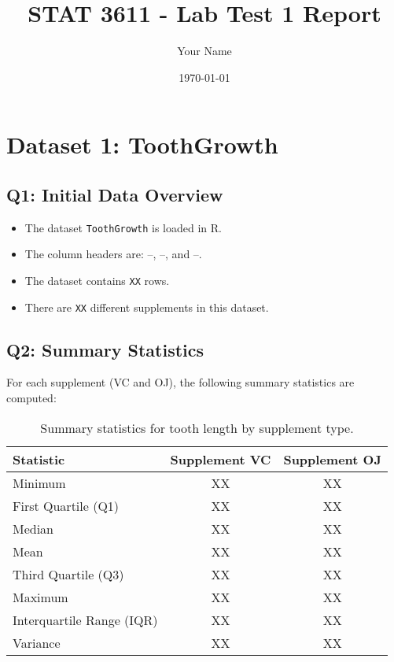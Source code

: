 \documentclass{article}
\title{STAT 3611 - Lab Test 1 Report}
\author{Your Name}
\date{\today}
\begin{document}
\maketitle

\section{Dataset 1: ToothGrowth}

\subsection{Q1: Initial Data Overview}
\begin{itemize}
    \item The dataset \texttt{ToothGrowth} is loaded in R.
    \item The column headers are: \---, \---, and \---.
    \item The dataset contains \texttt{XX} rows.
    \item There are \texttt{XX} different supplements in this dataset.
\end{itemize}

\subsection{Q2: Summary Statistics}
For each supplement (VC and OJ), the following summary statistics are computed:

\begin{table}[H]
    \centering
    \begin{tabular}{lcc}
        \toprule
        Statistic & Supplement VC & Supplement OJ \\
        \midrule
        Minimum & XX & XX \\
        First Quartile (Q1) & XX & XX \\
        Median & XX & XX \\
        Mean & XX & XX \\
        Third Quartile (Q3) & XX & XX \\
        Maximum & XX & XX \\
        Interquartile Range (IQR) & XX & XX \\
        Variance & XX & XX \\
        \bottomrule
    \end{tabular}
    \caption{Summary statistics for tooth length by supplement type.}
    \label{tab:summary_toothgrowth}
\end{table}
\end{document}
